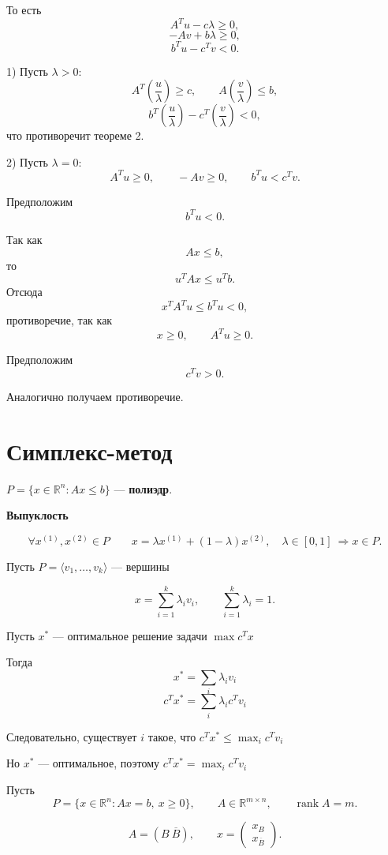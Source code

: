 \documentclass[12pt,a4paper]{article}
\begin{document}
\begin{proofbox}{}
То есть
\[
A^Tu-c\lambda\geq0,
\]
\[
-Av+b\lambda\geq0,
\]
\[
b^Tu-c^Tv<0.
\]

1) Пусть $\lambda>0$:
\[
A^T\left(\frac{u}{\lambda}\right)\geq c,
\qquad
A\left(\frac{v}{\lambda}\right)\leq b,
\]
\[
b^T\left(\frac{u}{\lambda}\right)
-c^T\left(\frac{v}{\lambda}\right)<0,
\]
что противоречит теореме 2.

\medskip

2) Пусть $\lambda=0$:
\[
A^Tu\geq0,
\qquad
-Av\geq0,
\qquad
b^Tu<c^Tv.
\]

Предположим
\[
b^Tu<0. \tag{*}
\]

Так как
\[
Ax\leq b,
\]
то
\[
u^TAx\leq u^Tb.
\]
Отсюда
\[
x^TA^Tu\leq b^Tu<0,
\]
противоречие, так как
\[
x\geq0,\qquad A^Tu\geq0.
\]

Предположим
\[
c^Tv>0. \tag{**}
\]

Аналогично получаем противоречие.
\end{proofbox}

\newpage

\section{Симплекс-метод}

$P=\{x\in\mathbb{R}^n:Ax\leq b\}$ --- \textbf{полиэдр}.

\begin{definition}

\textbf{Выпуклость}

\[
\forall x^{(1)},x^{(2)}\in P
\qquad
x=\lambda x^{(1)}+(1-\lambda)x^{(2)},\quad \lambda\in[0,1] \ \Longrightarrow x\in P.
\]
\end{definition}

Пусть $P=\langle v_1,\ldots,v_k\rangle$ --- вершины

\[
x=\sum_{i=1}^k\lambda_i v_i,
\qquad
\sum_{i=1}^k\lambda_i=1.
\]

Пусть $x^*$ --- оптимальное решение задачи $\max c^Tx$

Тогда
\[
x^*=\sum_i\lambda_i v_i
\]
\[
c^Tx^*=\sum_i\lambda_i c^Tv_i
\]

Следовательно, существует $i$ такое, что $c^Tx^*\leq \max_i c^Tv_i$

Но $x^*$ --- оптимальное, поэтому $c^Tx^*=\max_i c^Tv_i$

Пусть
\[
P=\{x\in\mathbb{R}^n:Ax=b,\ x\geq0\},
\qquad
A\in\mathbb{R}^{m\times n},
\qquad
\operatorname{rank}A=m.
\]

\[
A=(B\ \overline{B}),
\qquad
x=
\begin{pmatrix}
x_B\\
x_{\overline B}
\end{pmatrix}.
\]
\end{document}
